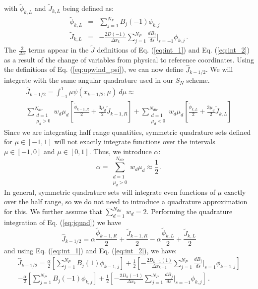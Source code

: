 \documentclass[11pt]{article}
\newcommand{\benum}{\begin{equation}}
\newcommand{\eenum}{\end{equation}}
\newcommand{\beanum}{\begin{eqnarray}}
\newcommand{\eeanum}{\end{eqnarray}}
\newcommand{\eqt}[1]{Eq. (\ref{#1})}
\newcommand{\B}[1]{\ensuremath{{B_{#1} }}}
\newcommand{\p}{\ensuremath{ d}}
\newcommand{\pep}{\, .}
\begin{document}
with $\widetilde{\phi}_{k,L}$ and $\widetilde{J}_{k,L}$ being defined as:
\begin{subequations}
\label{eq:int_2}
\beanum
\widetilde{\phi}_{k,L} &=& \sum_{j=1}^{N_P}{ \B{j}(-1) \phi_{k,j} } \\
\widetilde{J}_{k,L} &=& -\frac{2D(-1)}{\Delta x_k}\sum_{j=1}^{N_P}{ \frac{\p \B{j}}{\p s}  \bigg \lvert_{s=-1} \phi_{k,j} } \pep
\eeanum
\end{subequations}
The $\frac{2}{\Delta x}$ terms appear in the $\widetilde{J}$ definitions of \eqt{eq:int_1} and \eqt{eq:int_2} as a result of the change of variables from physical to reference coordinates.
Using the definitions of \eqt{eq:upwind_psi}, we can now define $\widehat{J}_{k-1/2}$.  We will integrate with the same angular quadrature used in our $S_N$ scheme.  
\begin{multline}
\label{eq:jquad}
\widehat{J}_{k-1/2} = \int_{-1}^1{\mu \psi(x_{k-1/2},\mu)~d\mu} \approx \\
\sum_{\substack{d=1 \\ \mu_d > 0}}^{N_{dir}}{w_d\mu_d\left[\frac{\widetilde{\phi}_{k-1,R}}{2} + \frac{3\mu_d}{2}\widetilde{J}_{k-1,R}  \right] } 
+ \sum_{\substack{d=1 \\ \mu_d < 0}}^{N_{dir}}{w_d\mu_d \left[ \frac{\widetilde{\phi}_{k,L}}{2} + \frac{3\mu_d}{2}\widetilde{J}_{k,L} \right] }
\end{multline}
Since we are integrating half range quantities, symmetric quadrature sets defined for $\mu\in[-1,1]$ will not exactly integrate functions over the intervals $\mu \in[-1,0]$ and $\mu\in[0,1]$.
Thus, we introduce $\alpha$:
\benum
\alpha = \sum_{\substack{d=1\\ \mu_d > 0}}^{N_{dir}}{w_d \mu_d} \approx \frac{1}{2} \pep
\eenum
In general, symmetric quadrature sets will integrate even functions of $\mu$ exactly over the half range, so we do not need to introduce a quadrature approximation for this.  We further assume that $\sum_{d=1}^{N_{dir}}{w_d} = 2$.  Performing the quadrature integration of \eqt{eq:jquad} we have
%
%
\benum
\widehat{J}_{k-1/2} = \alpha \frac{\widetilde{\phi}_{k-1,R}}{2} + \frac{\widetilde{J}_{k-1,R}}{2} - \alpha \frac{\widetilde{\phi}_{k,L}}{2} + \frac{\widetilde{J}_{k,L}}{2}
\eenum
and using \eqt{eq:int_1} and \eqt{eq:int_2}, we have:
\begin{multline}
\widehat{J}_{k-1/2} = 
\frac{\alpha}{2}\left[\sum_{j=1}^{N_P}{ \B{j}(1) \phi_{k-1,j} }\right] + 
\frac{1}{2}\left[ -\frac{2D_{k-1}(1)}{\Delta x_{k-1}} \sum_{j=1}^{N_P}{ \frac{\p \B{j}}{\p s} \bigg \lvert_{s=1} \phi_{k-1,j} } \right] \\
- \frac{\alpha}{2}\left[ \sum_{j=1}^{N_P}{ \B{j}(-1) \phi_{k,j} } \right] 
+ \frac{1}{2}\left[-\frac{2D_k(-1)}{\Delta x_k}\sum_{j=1}^{N_P}{ \frac{\p \B{j}}{\p s}  \bigg \lvert_{s=-1} \phi_{k,j} }\right] 
\pep
\end{multline}
\end{document}
